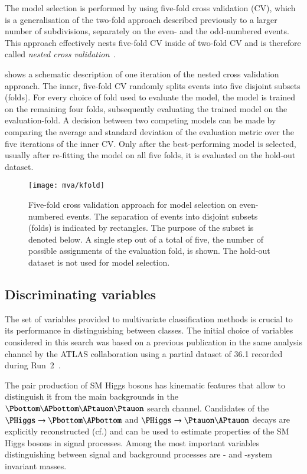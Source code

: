 The model selection is performed by using five-fold cross validation
(CV), which is a generalisation of the two-fold approach described
previously to a larger number of subdivisions, separately on the even-
and the odd-numbered events. This approach effectively nests five-fold
CV inside of two-fold CV and is therefore called \emph{nested cross
  validation}~\cite{cawley10,stone74}.

 shows a schematic description of one
iteration of the nested cross validation approach. The inner,
five-fold CV randomly splits events into five disjoint subsets
(folds). For every choice of fold used to evaluate the model, the
model is trained on the remaining four folds, subsequently evaluating
the trained model on the evaluation-fold. A decision between two
competing models can be made by comparing the average and standard
deviation of the evaluation metric over the five iterations of the
inner CV. Only after the best-performing model is selected, usually
after re-fitting the model on all five folds, it is evaluated on the
hold-out dataset.

\begin{figure}[htbp]
  \centering

  \texttt{[image: mva/kfold]}

  \caption{Five-fold cross validation approach for model selection on
    even-numbered events. The separation of events into disjoint
    subsets (folds) is indicated by rectangles. The purpose of the
    subset is denoted below. A single step out of a total of five, the
    number of possible assignments of the evaluation fold, is
    shown. The hold-out dataset is not used for model selection.}
  \label{fig:cross_validation}
\end{figure}


\subsection{Discriminating variables}
\label{sec:mva_discriminating variables}

The set of variables provided to multivariate classification methods
is crucial to its performance in distinguishing between classes. The
initial choice of variables considered in this search was based on a
previous publication in the same analysis channel by the ATLAS
collaboration using a partial dataset of \SI{36.1}{\ifb} recorded
during Run~2~\cite{HIGG-2016-16-witherratum}.

The pair production of SM Higgs bosons has kinematic features that
allow to distinguish it from the main backgrounds in the $\bbtautau$
search channel. Candidates of the $\PHiggs \ra \Pbottom\APbottom$ and
$\PHiggs \ra \Ptauon\APtauon$ decays are explicitly reconstructed
(cf.) and can be used to estimate properties of the SM
Higgs bosons in signal processes. Among the most important variables
distinguishing between signal and background processes are \PHiggs-
and \HH-system invariant masses.

